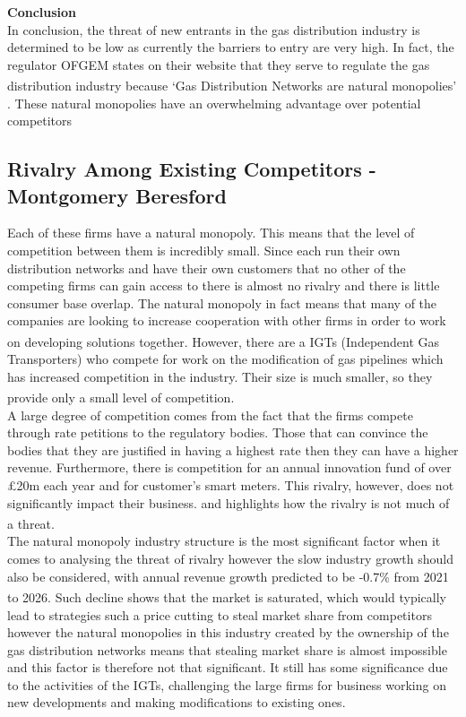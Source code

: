 \documentclass[11pt]{article}		%
\newcommand{\supercite}[1]{\textsuperscript{\cite{#1}}}		%
\begin{document}
			    \textbf{Conclusion}\\
                In conclusion, the threat of new entrants in the gas distribution industry is determined to be low as currently the barriers to entry are very high. In fact, the regulator OFGEM states on their website that they serve to regulate the gas distribution industry because ‘Gas Distribution Networks are natural monopolies’ \supercite{ofgemquote}. These natural monopolies have an overwhelming advantage over potential competitors
        \subsection[Rivalry Among Existing Competitors]{Rivalry Among Existing Competitors - Montgomery Beresford}
                Each of these firms have a natural monopoly. This means that the level of competition between them is incredibly small. Since each run their own distribution networks and have their own customers that no other of the competing firms can gain access to there is almost no rivalry and there is little consumer base overlap. The natural monopoly in fact means that many of the companies are looking to increase cooperation with other firms in order to work on developing solutions together.\supercite{SGN-GD2} 
                However, there are a IGTs (Independent Gas Transporters) who compete for work on the modification of gas pipelines which has increased competition in the industry. Their size is much smaller, so they provide only a small level of competition.\supercite{Gas_Distribution_Industry} 
                \\
                A large degree of competition comes from the fact that the firms compete through rate petitions to the regulatory bodies. Those that can convince the bodies that they are justified in having a highest rate then they can have a higher revenue. Furthermore, there is competition for an annual innovation fund of over £20m each year and for customer’s smart meters. This rivalry, however, does not significantly impact their business. and highlights how the rivalry is not much of a threat.\supercite{Gas_Distribution_Industry}
                \\
                The natural monopoly industry structure is the most significant factor when it comes to analysing the threat of rivalry however the slow industry growth should also be considered, with annual revenue growth predicted to be -0.7\% from 2021 to 2026.\supercite{Gas_Distribution_Industry} Such decline shows that the market is saturated, which would typically lead to strategies such a price cutting to steal market share from competitors however the natural monopolies in this industry created by the ownership of the gas distribution networks means that stealing market share is almost impossible and this factor is therefore not that significant. It still has some significance due to the activities of the IGTs, challenging the large firms for business working on new developments and making modifications to existing ones. 
\end{document}
